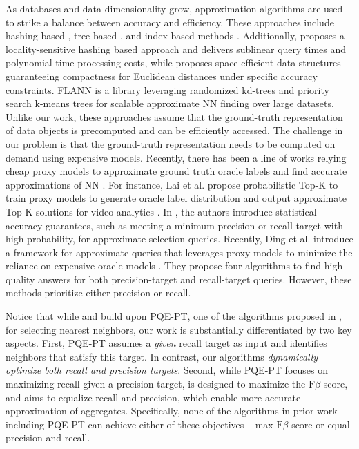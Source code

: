 As databases and data dimensionality grow, approximation algorithms are used to strike a balance between accuracy and efficiency. These approaches include hashing-based \cite{DBLP:journals/pvldb/HuangFZFN15}, tree-based \cite{DBLP:conf/cvpr/Silpa-AnanH08}, and index-based methods \cite{arora2018hd}. Additionally, \cite{indyk1998approximate} proposes a locality-sensitive hashing based approach and delivers sublinear query times and polynomial time processing costs, while \cite{indyk2018approximate} proposes space-efficient data structures guaranteeing compactness for Euclidean distances under specific accuracy constraints. FLANN \cite{muja2014scalable} is a library leveraging randomized kd-trees and priority search k-means trees for scalable approximate NN finding over large datasets. Unlike our work, these approaches assume that the ground-truth representation of data objects is precomputed and can be efficiently accessed. The challenge in our problem is that the ground-truth representation needs to be computed on demand using expensive models. Recently, there has been a line of works relying cheap proxy models to approximate ground truth oracle labels and find accurate approximations of NN \cite{DBLP:conf/sigmod/LaiHLZ0K21, DBLP:conf/sigmod/LuCKC18, DBLP:journals/pvldb/KangGBHZ20, DBLP:journals/pvldb/KangEABZ17}. For instance, Lai et al. propose probabilistic Top-K to train proxy models to generate oracle label distribution and output approximate Top-K solutions for video analytics \cite{DBLP:conf/sigmod/LaiHLZ0K21}. In \cite{DBLP:journals/pvldb/KangGBHZ20}, the authors introduce statistical accuracy guarantees, such as meeting a minimum precision or recall target with high probability, for approximate selection queries. Recently, Ding et al. introduce a  framework for approximate queries that leverages proxy models to minimize the reliance on expensive oracle models \cite{DujianPQA}. They propose four algorithms to find high-quality answers for both precision-target and recall-target queries. However, these methods prioritize either precision or recall. 

Notice that while \sprintv and \sprintc build upon PQE-PT, one of the algorithms proposed in \cite{DujianPQA}, for selecting nearest neighbors, our work is substantially differentiated by two key aspects. First, PQE-PT assumes a \textit{given} recall target as input and identifies neighbors that satisfy this target. In contrast, our algorithms \textit{dynamically optimize both recall and precision targets}. Second, while PQE-PT focuses on maximizing recall given a precision target, \sprintv is designed to maximize the \(\text{F}{\beta}\) score, and \sprintc aims to equalize recall and precision, which enable more accurate approximation of aggregates. Specifically, none of the algorithms in prior work including PQE-PT can achieve either of these objectives -- max \(\text{F}{\beta}\) score or equal precision and recall.

